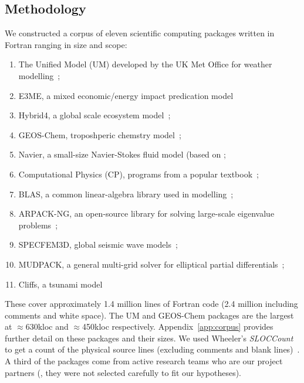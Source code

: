 \subsection{Methodology}
%
\noindent
We constructed a corpus of eleven scientific computing packages
written in Fortran ranging in size and scope:
%
\begin{enumerate}[leftmargin=1.76em]
\item The Unified Model (UM) developed by the UK Met Office
for weather modelling~\cite{um};
\item E3ME, a mixed economic/energy impact predication
  model~\cite{RePEc:aen:journl:2006se-a12}

\item Hybrid4, a global scale ecosystem model~\cite{GBC:GBC635};

\item GEOS-Chem, troposhperic chemstry model~\cite{geos-chem};

\item Navier, a small-size Navier-Stokes fluid model (based
  on \cite{griebel1997numerical};

\item Computational Physics (CP), programs from a popular
 textbook~\cite{giordano1997computational};

\item BLAS, a common linear-algebra
  library used in modelling~\cite{blas};

\item ARPACK-NG, an open-source library for solving large-scale
eigenvalue problems~\cite{arpackng};

\item SPECFEM3D, global seismic wave models~\cite{specfem3d};

\item MUDPACK, a general multi-grid solver for elliptical
partial differentials~\cite{MUD};

\item Cliffs, a tsunami model~\cite{tolkova2014land}
\end{enumerate}
%
These cover approximately 1.4 million lines of Fortran code
(2.4 million including comments and white space).  The UM and
GEOS-Chem packages are the largest at $\approx$630kloc and
$\approx$450kloc respectively.  Appendix~\ref{app:corpus} provides
further detail on these packages and their sizes.  We used Wheeler's
\emph{SLOCCount} to get a count of the physical source lines
(excluding comments and blank lines)~\cite{wheeler2001sloccount}.
A third of the packages come from active research teams who are our project
partners (\ie{}, they were not selected carefully to fit our
hypotheses).


